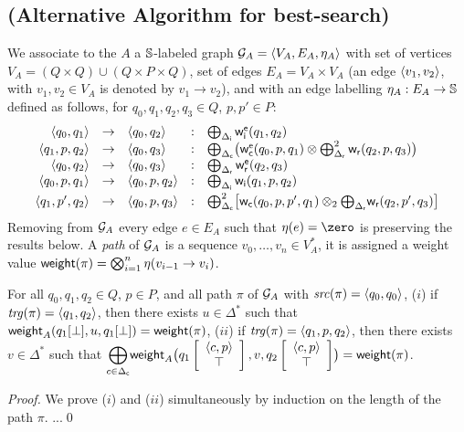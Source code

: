 %

\subsection*{(Alternative Algorithm for best-search)}
We associate to the \SWVPA $A$ a $\mathbb{S}$-labeled graph
$\G_A = \< V_A, E_A, \eta_A >$
with set of vertices $V_A = (Q \times Q) \cup (Q \times P \times Q)$,
set of edges $E_A = V_A \times V_A$
(an edge $\< v_1, v_2>$, with $v_1, v_2 \in V_A$ is denoted by $v_1 \to v_2$),
and with an edge labelling  
$\eta_A : E_A \to \mathbb{S}$ defined as follows,
for $q_0, q_1, q_2, q_3 \in Q$, $p, p' \in P$:
%
\[
\begin{array}{rclcl}
\< q_0, q_1> & \to & \< q_0, q_2> & : &
\bigoplus_{\Deltai} \weiei(q_1, q_2)\\
%
\< q_1, p, q_2> & \to & \<q_0, q_3> & : &
\bigoplus_{\Deltac} \bigl( \weiec(q_0, p, q_1) \otimes \bigoplus^2_{\Deltar} \weir(q_2, p, q_3)\bigr)\\ 
%
\< q_0, q_2> & \to & \< q_0, q_3> & : & 
\bigoplus_{\Deltar} \weier(q_2, q_3)\\
% 
\< q_0, p, q_1> & \to & \< q_0, p, q_2> & : &
\bigoplus_{\Deltai} \weii(q_1, p, q_2)\\[1mm]
%
\< q_1, p', q_2> & \to & \< q_0, p, q_3> & : &
\bigoplus^2_{\Deltac} \bigl[ \weic(q_0, p, p', q_1) \otimes_2 {\bigoplus_{\Deltar}} \weir(q_2, p', q_3) \bigr]\\
\end{array}
\]
Removing from $\mathcal{G}_A$ every edge $e \in E_A$ such that $\eta(e) = \zero$ 
is preserving the results below.
%
A \emph{path} of $\mathcal{G}_A$ is a sequence $v_0,\ldots, v_n \in V^*_A$,
it is assigned a weight value $\mathsf{weight}(\pi) = \bigotimes_{i=1}^{n} \eta(v_{i-1} \to v_i)$.

\begin{lemma}[Correctness]
For all $q_0, q_1, q_2 \in Q$, $p\in P$, 
and all path $\pi$ of $\mathcal{G}_A$ with $\src(\pi) = \<q_0, q_0>$,
($i$) if $\trg(\pi) = \< q_1, q_2>$, 
then there exists $u \in \Delta^*$ such that 
$\mathsf{weight}_A(q_1[\bot], u, q_1[\bot]) = \mathsf{weight}(\pi)$,
%
($ii$) if $\trg(\pi) = \< q_1, p, q_2>$,
then there exists $v \in \Delta^*$ such that 
${\displaystyle\bigoplus_{c \in \Deltac}}
 \weight_A\bigl(\configup{q_1}{\< c, p> \stackup \top }, v, \configup{q_2}{\<c, p> \stackup \top}\bigr)
 = \weight(\pi)$.
\end{lemma}
%
\begin{proof}
We prove ($i$) and ($ii$) simultaneously by induction on the length of the path $\pi$.
...\qed
\end{proof}



